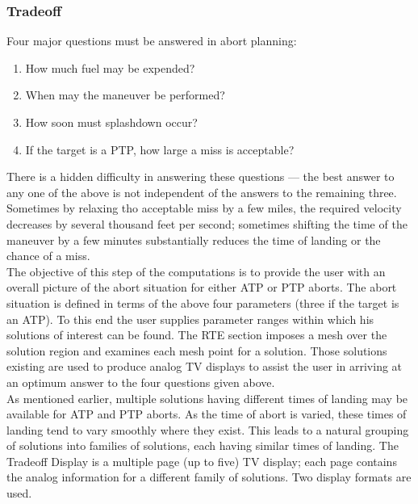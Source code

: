 \documentclass[11pt]{article} %
\begin{document}
\subsubsection{Tradeoff}

Four major questions must be answered in abort planning:
\begin{enumerate}
\item How much fuel may be expended?
\item When may the maneuver be performed?
\item How soon must splashdown occur?
\item If the target is a PTP, how large a miss is acceptable?
\end{enumerate}

There is a hidden difficulty in answering these questions — the best answer to any one of the above is not independent of the answers to the remaining three. Sometimes by relaxing tho acceptable miss by a few miles, the required velocity decreases by several thousand feet per second; sometimes shifting the time of the
maneuver by a few minutes substantially reduces the time of landing or the chance of a miss.\\
The objective of this step of the computations is to provide the user with an overall picture of the abort situation for either ATP or PTP aborts. The abort situation is defined in terms of the above four parameters (three if the target is an ATP). To this end the user supplies parameter ranges within which his solutions of interest can be found. The RTE section imposes a mesh over the solution region and examines each mesh point for a solution. Those solutions existing are used to produce analog TV displays to assist the user in arriving at an optimum answer to the four questions given above.\\
As mentioned earlier, multiple solutions having different times of landing may be available for ATP and PTP aborts. As the time of abort is varied, these times
of landing tend to vary smoothly where they exist. This leads to a natural grouping of solutions into families of solutions, each having similar times of landing.
The Tradeoff Display is a multiple page (up to five) TV display; each page contains the analog information for a different family of solutions. Two display formats are used.
\end{document}
